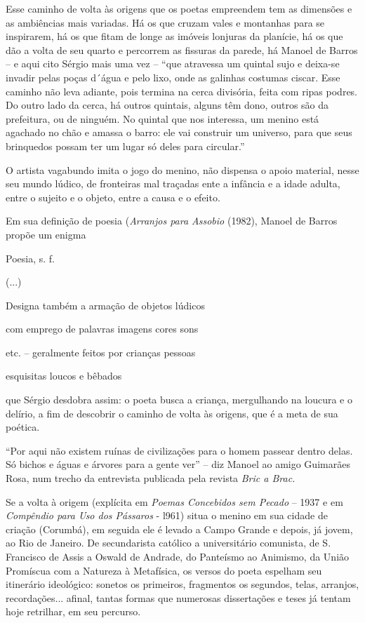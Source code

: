 Esse caminho de volta às origens que os poetas empreendem tem as
dimensões e as ambiências mais variadas. Há os que cruzam vales e
montanhas para se inspirarem, há os que fitam de longe as imóveis
lonjuras da planície, há os que dão a volta de seu quarto e percorrem as
fissuras da parede, há Manoel de Barros -- e aqui cito Sérgio mais uma
vez -- ``que atravessa um quintal sujo e deixa-se invadir pelas poças
d´água e pelo lixo, onde as galinhas costumas ciscar. Esse caminho não
leva adiante, pois termina na cerca divisória, feita com ripas podres.
Do outro lado da cerca, há outros quintais, alguns têm dono, outros são
da prefeitura, ou de ninguém. No quintal que nos interessa, um menino
está agachado no chão e amassa o barro: ele vai construir um universo,
para que seus brinquedos possam ter um lugar só deles para circular.''

O artista vagabundo imita o jogo do menino, não dispensa o apoio
material, nesse seu mundo lúdico, de fronteiras mal traçadas ente a
infância e a idade adulta, entre o sujeito e o objeto, entre a causa e o
efeito.

Em sua definição de poesia (\emph{Arranjos para Assobio} (1982), Manoel
de Barros propõe um enigma

{Poesia}, s. f.

(...)

Designa também a armação de objetos lúdicos

com emprego de palavras imagens cores sons

etc. -- geralmente feitos por crianças pessoas

esquisitas loucos e bêbados

que Sérgio desdobra assim: o poeta busca a criança, mergulhando na
loucura e o delírio, a fim de descobrir o caminho de volta às origens,
que é a meta de sua poética.

``Por aqui não existem ruínas de civilizações para o homem passear
dentro delas. Só bichos e águas e árvores para a gente ver'' -- diz
Manoel ao amigo Guimarães Rosa, num trecho da entrevista publicada pela
revista \emph{Bric a Brac.}

Se a volta à origem (explícita em \emph{Poemas Concebidos sem Pecado} --
1937 e em \emph{Compêndio para Uso dos Pássaros} - l961) situa o menino
em sua cidade de criação (Corumbá), em seguida ele é levado a Campo
Grande e depois, já jovem, ao Rio de Janeiro. De secundarista católico a
universitário comunista, de S. Francisco de Assis a Oswald de Andrade,
do Panteísmo ao Animismo, da União Promíscua com a Natureza à
Metafísica, os versos do poeta espelham seu itinerário ideológico:
sonetos os primeiros, fragmentos os segundos, telas, arranjos,
recordações... afinal, tantas formas que numerosas dissertações e teses
já tentam hoje retrilhar, em seu percurso.


